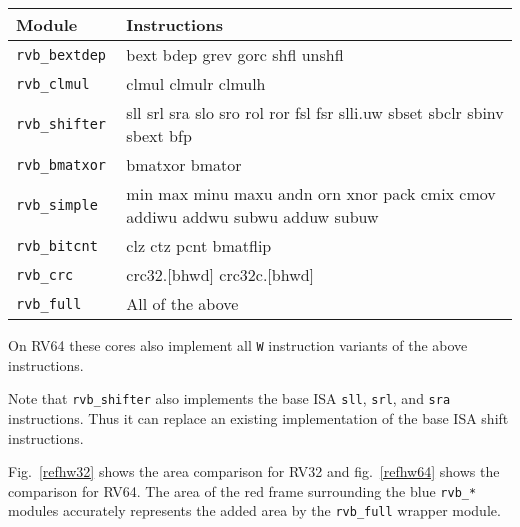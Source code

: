 \begin{center}
\begin{tabular}{lp{6cm}}
Module & Instructions \\
\hline
\tt rvb\_bextdep  & bext bdep grev gorc shfl unshfl                                               \\
\tt rvb\_clmul    & clmul clmulr clmulh                                                           \\
\tt rvb\_shifter  & sll srl sra slo sro rol ror fsl fsr slli.uw sbset sbclr sbinv sbext bfp       \\
\tt rvb\_bmatxor  & bmatxor bmator                                                                \\
\tt rvb\_simple   & min max minu maxu andn orn xnor pack cmix cmov addiwu addwu subwu adduw subuw \\
\tt rvb\_bitcnt   & clz ctz pcnt bmatflip                                                         \\
\tt rvb\_crc      & crc32.[bhwd] crc32c.[bhwd]                                                    \\
\tt rvb\_full     & All of the above                                                              \\
\end{tabular}
\end{center}

On RV64 these cores also implement all {\tt *W} instruction variants of the above instructions.

Note that {\tt rvb\_shifter} also implements the base ISA {\tt sll}, {\tt srl},
and {\tt sra} instructions. Thus it can replace an existing implementation of
the base ISA shift instructions.

Fig.~\ref{refhw32} shows the area comparison for RV32 and fig.~\ref{refhw64} shows the comparison for RV64.
The area of the red frame surrounding the blue {\tt rvb\_*} modules accurately represents the added area
by the {\tt rvb\_full} wrapper module.

